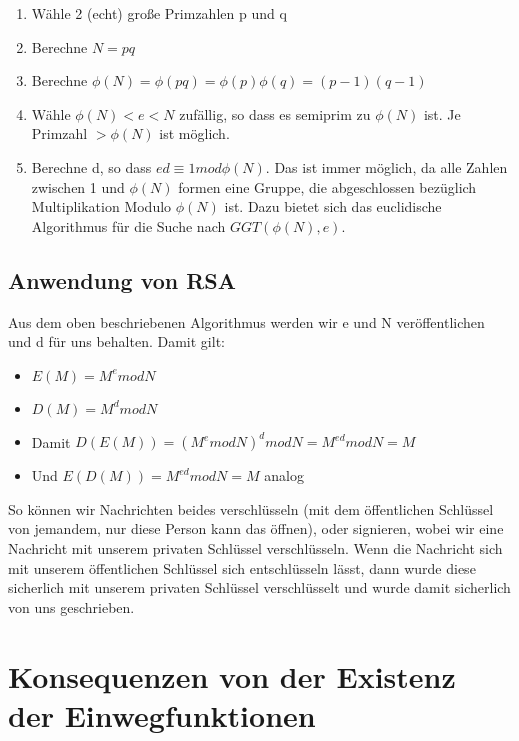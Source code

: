 \documentclass[12pt,a4paper]{article}
\theoremstyle{definition}
\begin{document}
    \begin{enumerate}
        \item Wähle 2 (echt) große Primzahlen p und q
        \item Berechne $N = pq$
        \item Berechne $\phi(N) = \phi(pq) = \phi(p) \phi(q) = (p-1)(q-1)$
        \item Wähle $\phi(N) < e < N$ zufällig, so dass es semiprim zu $\phi(N)$ ist. Je Primzahl $> \phi(N)$ ist möglich.
        \item Berechne d, so dass $ed \equiv 1 mod \phi(N)$. Das ist immer möglich, da alle Zahlen zwischen 1 und
            $\phi(N)$ formen eine Gruppe, die abgeschlossen bezüglich Multiplikation Modulo $\phi(N)$ ist.
            Dazu bietet sich das euclidische Algorithmus für die Suche nach $GGT(\phi(N), e)$.
    \end{enumerate}

    \subsection{Anwendung von RSA}

    Aus dem oben beschriebenen Algorithmus werden wir e und N veröffentlichen und d für uns behalten. Damit gilt:

    \begin{itemize}
        \item $E(M) = M^e mod N$
        \item $D(M) = M^d mod N$
        \item Damit $D(E(M)) = (M^e mod N)^d mod N = M^{ed} mod N = M$
        \item Und $E(D(M)) = M^{ed} mod N = M$ analog
    \end{itemize}

    So können wir Nachrichten beides verschlüsseln (mit dem öffentlichen Schlüssel von jemandem, nur diese Person
    kann das öffnen), oder signieren, wobei wir eine Nachricht mit unserem privaten Schlüssel verschlüsseln. Wenn die
    Nachricht sich mit unserem öffentlichen Schlüssel sich entschlüsseln lässt, dann wurde diese sicherlich mit unserem
    privaten Schlüssel verschlüsselt und wurde damit sicherlich von uns geschrieben.

    \section{Konsequenzen von der Existenz der Einwegfunktionen}
\end{document}
